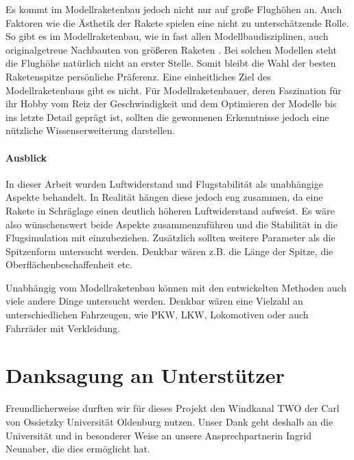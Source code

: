 \documentclass[10pt,a4paper]{article}
\begin{document}
Es kommt im Modellraketenbau jedoch nicht nur auf große Flughöhen an. Auch Faktoren wie die Ästhetik der Rakete spielen eine nicht zu unterschätzende Rolle. So gibt es im Modellraketenbau, wie in fast allen Modellbaudisziplinen, auch originalgetreue Nachbauten von größeren Raketen \cite{om}. Bei solchen Modellen steht die Flughöhe natürlich nicht an erster Stelle.
Somit bleibt die Wahl der besten Raketenspitze persönliche Präferenz. Eine einheitliches Ziel des Modellraketenbaus gibt es nicht. Für Modellraketenbauer, deren Faszination für ihr Hobby vom Reiz der Geschwindigkeit und dem Optimieren der Modelle bis ins letzte Detail geprägt ist, sollten die gewonnenen Erkenntnisse jedoch eine nützliche Wissenserweiterung darstellen.

\paragraph{Ausblick}
In dieser Arbeit wurden Luftwiderstand und Flugstabilität als unabhängige Aspekte behandelt. In Realität hängen diese jedoch eng zusammen, da eine Rakete in Schräglage einen deutlich höheren Luftwiderstand aufweist. Es wäre also wünschenswert beide Aspekte zusammenzuführen und die Stabilität in die Flugsimulation mit einzubeziehen. 
Zusätzlich sollten weitere Parameter als die Spitzenform untersucht werden. Denkbar wären z.B. die Länge der Spitze, die Oberflächenbeschaffenheit etc. 

Unabhängig vom Modellraketenbau können mit den entwickelten Methoden auch viele andere Dinge untersucht werden. Denkbar wären eine Vielzahl an unterschiedlichen Fahrzeugen, wie PKW, LKW, Lokomotiven oder auch Fahrräder mit Verkleidung.



\appendix
\section{Danksagung an Unterstützer}

Freundlicherweise durften wir für dieses Projekt den Windkanal TWO der Carl von Ossietzky Universität Oldenburg nutzen. Unser Dank geht deshalb an die Universität und in besonderer Weise an unsere Ansprechpartnerin Ingrid Neunaber, die dies ermöglicht hat.
\end{document}
